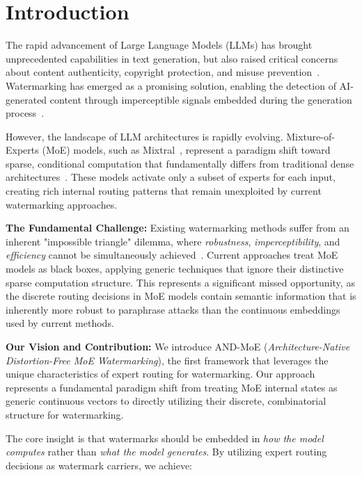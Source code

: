 \documentclass[letterpaper,twocolumn,10pt]{article}
\begin{document}
\section{Introduction}

The rapid advancement of Large Language Models (LLMs) has brought unprecedented capabilities in text generation, but also raised critical concerns about content authenticity, copyright protection, and misuse prevention~\cite{christ2023watermarking}. Watermarking has emerged as a promising solution, enabling the detection of AI-generated content through imperceptible signals embedded during the generation process~\cite{kirchenbauer2023watermark}.

However, the landscape of LLM architectures is rapidly evolving. Mixture-of-Experts (MoE) models, such as Mixtral~\cite{jiang2024mixtral}, represent a paradigm shift toward sparse, conditional computation that fundamentally differs from traditional dense architectures~\cite{fedus2021switch}. These models activate only a subset of experts for each input, creating rich internal routing patterns that remain unexploited by current watermarking approaches.

\textbf{The Fundamental Challenge:} Existing watermarking methods suffer from an inherent "impossible triangle" dilemma, where \textit{robustness}, \textit{imperceptibility}, and \textit{efficiency} cannot be simultaneously achieved~\cite{li2023survey}. Current approaches treat MoE models as black boxes, applying generic techniques that ignore their distinctive sparse computation structure. This represents a significant missed opportunity, as the discrete routing decisions in MoE models contain semantic information that is inherently more robust to paraphrase attacks than the continuous embeddings used by current methods.

\textbf{Our Vision and Contribution:} We introduce AND-MoE (\textit{Architecture-Native Distortion-Free MoE Watermarking}), the first framework that leverages the unique characteristics of expert routing for watermarking. Our approach represents a fundamental paradigm shift from treating MoE internal states as generic continuous vectors to directly utilizing their discrete, combinatorial structure for watermarking.

The core insight is that watermarks should be embedded in \textit{how the model computes} rather than \textit{what the model generates}. By utilizing expert routing decisions as watermark carriers, we achieve:
\end{document}
